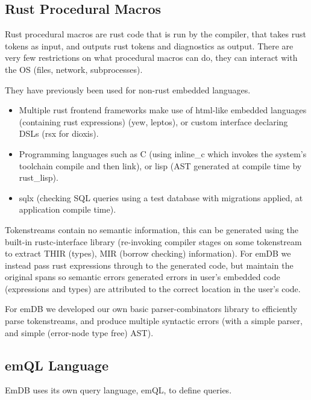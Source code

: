 \documentclass[conference]{IEEEtran}
\begin{document}
\subsection{Rust Procedural Macros}
Rust procedural macros are rust code that is run by the compiler, that takes rust
tokens as input, and outputs rust tokens and diagnostics as output. There are
very few restrictions on what procedural macros can do, they can interact with the
OS (files, network, subprocesses).

They have previously been used for non-rust embedded languages.
\begin{itemize}
    \item Multiple rust frontend frameworks make use of html-like embedded languages (containing rust expressions) (yew, leptos), or custom interface declaring DSLs (rsx for dioxis).
    \item Programming languages such as C (using inline\_c which invokes the system's toolchain compile and then link), or lisp (AST generated at compile time by rust\_lisp).
    \item sqlx (checking SQL queries using a test database with migrations applied, at application compile time).
\end{itemize}

Tokenstreams contain no semantic information, this can be generated using the built-in
rustc-interface library (re-invoking compiler stages on some tokenstream to
extract THIR (types), MIR (borrow checking) information). For emDB we instead pass
rust expressions through to the generated code, but maintain the original spans so
semantic errors generated errors in user's embedded code (expressions and types) are
attributed to the correct location in the user's code.

For emDB we developed our own basic parser-combinators library to efficiently parse tokenstreams,
and produce multiple syntactic errors (with a simple parser, and simple (error-node type free) AST).

\subsection{emQL Language}
EmDB uses its own query language, emQL, to define queries.

\end{document}

